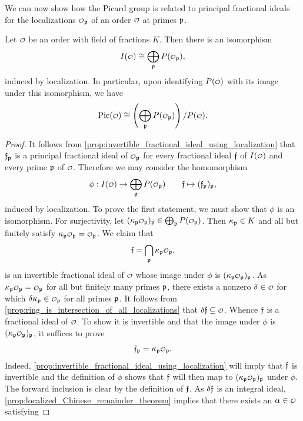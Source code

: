     We can now show how the Picard group is related to principal fractional ideals for the localizations \(\smc{O}_{\mf{p}}\) of an order \(\smc{O}\) at primes \(\mathfrak{p}\).

    \begin{proposition}\label{prop:localization_Picard_isomorphism}
      Let \(\smc{O}\) be an order with field of fractions \(K\). Then there is an isomorphism
      \[
        I(\smc{O}) \cong \bigop_{\mf{p}}P(\smc{O}_{\mf{p}}),
      \]
      induced by localization. In particular, upon identifying \(P(\smc{O})\) with its image under this isomorphism, we have
      \[
        \Pic(\smc{O}) \cong \left(\bigop_{\mf{p}}P(\smc{O}_{\mf{p}})\right)/P(\smc{O}).
      \]
    \end{proposition}
    \begin{proof}
      It follows from \cref{prop:invertible_fractional_ideal_using_localization} that \(\mathfrak{f}_{\mathfrak{p}}\) is a principal fractional ideal of \(\smc{O}_{\mf{p}}\) for every fractional ideal \(\mathfrak{f}\) of \(I(\smc{O})\) and every prime \(\mathfrak{p}\) of \(\smc{O}\). Therefore we may consider the homomorphism
      \[
        \phi:I(\smc{O}) \to \bigop_{\mf{p}}P(\smc{O}_{\mf{p}}) \qquad \mf{f} \mapsto (\mf{f}_{\mf{p}})_{\mf{p}},
      \]
      induced by localization. To prove the first statement, we must show that \(\phi\) is an isomorphism. For surjectivity, let \((\k_{\mf{p}}\smc{O}_{\mf{p}})_{\mf{p}} \in \bigop_{\mf{p}}P(\smc{O}_{\mf{p}})\). Then \(\kappa_{\mathfrak{p}} \in K\) and all but finitely satisfy \(\k_{\mf{p}}\smc{O}_{\mf{p}} = \smc{O}_{\mf{p}}\). We claim that
      \[
        \mf{f} = \bigcap_{\mf{p}}\k_{\mf{p}}\smc{O}_{\mf{p}},
      \]
      is an invertible fractional ideal of \(\smc{O}\) whose image under \(\phi\) is \((\k_{\mf{p}}\smc{O}_{\mf{p}})_{\mf{p}}\). As \(\k_{\mf{p}}\smc{O}_{\mf{p}} = \smc{O}_{\mf{p}}\) for all but finitely many primes \(\mathfrak{p}\), there exists a nonzero \(\d \in \smc{O}\) for which \(\d\k_{\mf{p}} \in \smc{O}_{\mf{p}}\) for all primes \(\mathfrak{p}\). It follows from \cref{prop:ring_is_intersection_of_all_localizations} that \(\d\mf{f} \subseteq \smc{O}\). Whence \(\mathfrak{f}\) is a fractional ideal of \(\smc{O}\). To show it is invertible and that the image under \(\phi\) is \((\k_{\mf{p}}\smc{O}_{\mf{p}})_{\mf{p}}\), it suffices to prove
      \[
        \mf{f}_{\mf{p}} = \k_{\mf{p}}\smc{O}_{\mf{p}}.
      \]
      Indeed, \cref{prop:invertible_fractional_ideal_using_localization} will imply that \(\mathfrak{f}\) is invertible and the definition of \(\phi\) shows that \(\mathfrak{f}\) will then map to \((\k_{\mf{p}}\smc{O}_{\mf{p}})_{\mf{p}}\) under \(\phi\). The forward inclusion is clear by the definition of \(\mathfrak{f}\). As \(\delta\mathfrak{f}\) is an integral ideal, \cref{prop:localized_Chinese_remainder_theorem} implies that there exists an \(\a \in \smc{O}\) satisfying

\end{proof}
